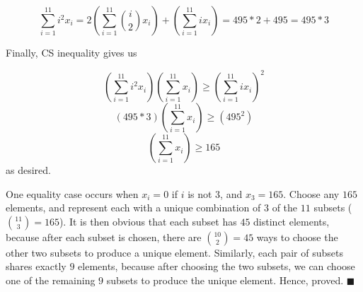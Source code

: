 \begin{enumerate}
 
 \[\sum_{i=1}^{11}i^2x_i=2(\sum_{i=1}^{11}\binom{i}{2}x_i)+(\sum_{i=1}^{11}ix_i)=495*2+495=495*3\]

 Finally, CS inequality gives us

 
 \[(\sum_{i=1}^{11}i^2x_i)(\sum_{i=1}^{11}x_i)\ge(\sum_{i=1}^{11}ix_i)^2\]
 \[(495*3)(\sum_{i=1}^{11}x_i)\ge(495^2)\]
 \[\boxed{(\sum_{i=1}^{11}x_i)\ge 165}\]as desired. 

 One equality case occurs when $x_i=0$ if $i$ is not $3$, and $x_3=165$. Choose any $165$ elements, and represent each with a unique combination of $3$ of the $11$ subsets ($\binom{11}{3}=165$). It is then obvious that each subset has $45$ distinct elements, because after each subset is chosen, there are $\binom{10}{2}=45$ ways to choose the other two subsets to produce a unique element. Similarly, each pair of subsets shares exactly $9$ elements, because after choosing the two subsets, we can choose one of the remaining $9$ subsets to produce the unique element. Hence, proved. $\blacksquare{}$



\end{enumerate}